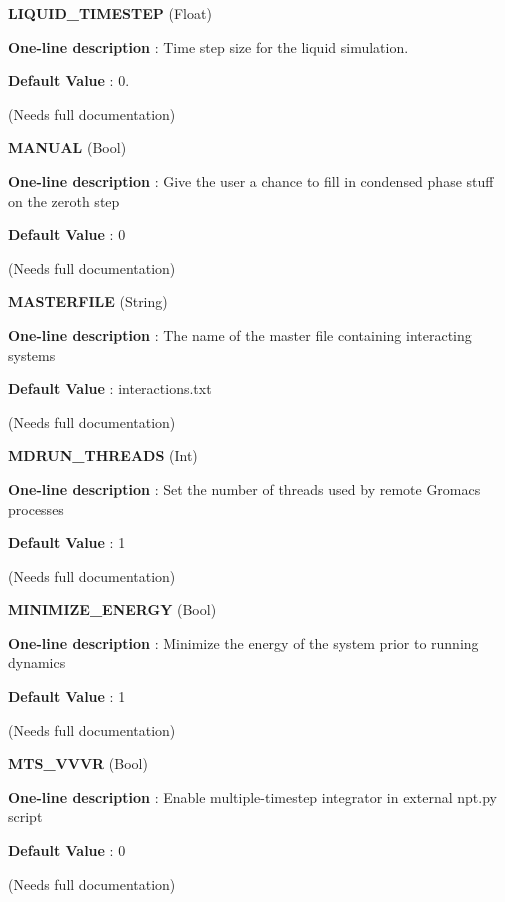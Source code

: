 \begin{DoxyItemize}
\item {\bfseries  L\-I\-Q\-U\-I\-D\-\_\-\-T\-I\-M\-E\-S\-T\-E\-P } (Float) \par
{\bfseries  One-\/line description }\-: Time step size for the liquid simulation. \par
{\bfseries  Default Value }\-: 0. \par
(Needs full documentation)\end{DoxyItemize}
\begin{DoxyItemize}
\item {\bfseries  M\-A\-N\-U\-A\-L } (Bool) \par
{\bfseries  One-\/line description }\-: Give the user a chance to fill in condensed phase stuff on the zeroth step \par
{\bfseries  Default Value }\-: 0 \par
(Needs full documentation)\end{DoxyItemize}
\begin{DoxyItemize}
\item {\bfseries  M\-A\-S\-T\-E\-R\-F\-I\-L\-E } (String) \par
{\bfseries  One-\/line description }\-: The name of the master file containing interacting systems \par
{\bfseries  Default Value }\-: interactions.\-txt \par
(Needs full documentation)\end{DoxyItemize}
\begin{DoxyItemize}
\item {\bfseries  M\-D\-R\-U\-N\-\_\-\-T\-H\-R\-E\-A\-D\-S } (Int) \par
{\bfseries  One-\/line description }\-: Set the number of threads used by remote Gromacs processes \par
{\bfseries  Default Value }\-: 1 \par
(Needs full documentation)\end{DoxyItemize}
\begin{DoxyItemize}
\item {\bfseries  M\-I\-N\-I\-M\-I\-Z\-E\-\_\-\-E\-N\-E\-R\-G\-Y } (Bool) \par
{\bfseries  One-\/line description }\-: Minimize the energy of the system prior to running dynamics \par
{\bfseries  Default Value }\-: 1 \par
(Needs full documentation)\end{DoxyItemize}
\begin{DoxyItemize}
\item {\bfseries  M\-T\-S\-\_\-\-V\-V\-V\-R } (Bool) \par
{\bfseries  One-\/line description }\-: Enable multiple-\/timestep integrator in external npt.\-py script \par
{\bfseries  Default Value }\-: 0 \par
(Needs full documentation)\end{DoxyItemize}

